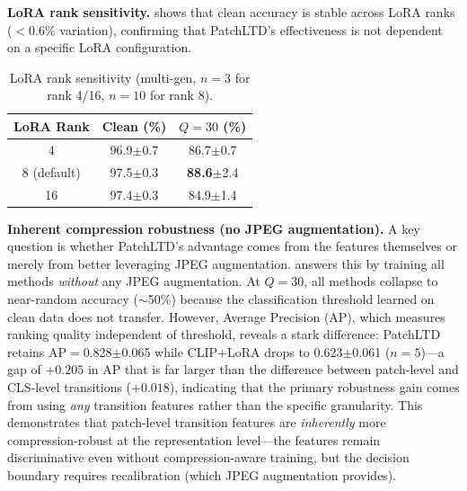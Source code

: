 \documentclass[runningheads]{llncs}
\newcommand{\ours}{PatchLTD}
\begin{document}
\noindent\textbf{LoRA rank sensitivity.}
 shows that clean accuracy is stable across LoRA ranks ($<$0.6\% variation), confirming that \ours{}'s effectiveness is not dependent on a specific LoRA configuration.

\begin{table}[t]
\centering
\caption{LoRA rank sensitivity (multi-gen, $n{=}3$ for rank 4/16, $n{=}10$ for rank 8).}
\label{tab:lora_rank}
\setlength{\tabcolsep}{6pt}
\begin{tabular}{ccc}
\toprule
LoRA Rank & Clean (\%) & $Q{=}30$ (\%) \\
\midrule
4          & 96.9\scriptsize$\pm$0.7 & 86.7\scriptsize$\pm$0.7 \\
8 (default)& 97.5\scriptsize$\pm$0.3 & \textbf{88.6}\scriptsize$\pm$2.4 \\
16         & 97.4\scriptsize$\pm$0.3 & 84.9\scriptsize$\pm$1.4 \\
\bottomrule
\end{tabular}
\end{table}

\noindent\textbf{Inherent compression robustness (no JPEG augmentation).}
A key question is whether \ours{}'s advantage comes from the features themselves or merely from better leveraging JPEG augmentation.
 answers this by training all methods \emph{without} any JPEG augmentation.
At $Q{=}30$, all methods collapse to near-random accuracy ($\sim$50\%) because the classification threshold learned on clean data does not transfer.
However, Average Precision (AP), which measures ranking quality independent of threshold, reveals a stark difference: \ours{} retains AP$=$0.828$\pm$0.065 while CLIP+LoRA drops to 0.623$\pm$0.061 ($n{=}5$)---a gap of $+0.205$ in AP that is far larger than the difference between patch-level and CLS-level transitions ($+0.018$), indicating that the primary robustness gain comes from using \emph{any} transition features rather than the specific granularity.
This demonstrates that patch-level transition features are \emph{inherently} more compression-robust at the representation level---the features remain discriminative even without compression-aware training, but the decision boundary requires recalibration (which JPEG augmentation provides).
\end{document}
